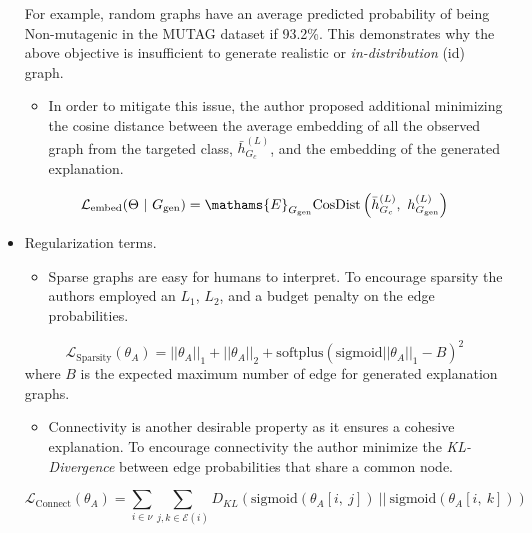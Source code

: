 \documentclass[
  11pt,
  letterpaper,
]{article}
\providecommand{\tightlist}{%
  \setlength{\itemsep}{0pt}\setlength{\parskip}{0pt}}\usepackage{longtable,booktabs,array}
\begin{document}
\begin{itemize}
  For example, random graphs have an average predicted probability of
  being Non-mutagenic in the MUTAG dataset if 93.2\%. This demonstrates
  why the above objective is insufficient to generate realistic or
  \emph{in-distribution} (id) graph.

  \begin{itemize}
  \tightlist
  \item
    In order to mitigate this issue, the author proposed additional
    minimizing the cosine distance between the average embedding of all
    the observed graph from the targeted class, \(\bar h^{(L)}_{G_c}\),
    and the embedding of the generated explanation.
  \end{itemize}

  \begin{equation}
       \mathcal{L}_{\text{embed}}(\Theta \ | \ G_\text{gen}) = 
            \mathams{E}_{G_\text{gen}}
            \text{CosDist}\left( \bar h^{(L)}_{G_c}, \ h^{(L)}_{G_\text{gen}} \right)
    \end{equation}
\item
  Regularization terms.

  \begin{itemize}
  \tightlist
  \item
    Sparse graphs are easy for humans to interpret. To encourage
    sparsity the authors employed an \(L_1\), \(L_2\), and a budget
    penalty on the edge probabilities.
  \end{itemize}

  \begin{equation}
        \mathcal{L}_{\text{Sparsity}}(\theta_A) = ||\theta_A||_1 + ||\theta_A||_2 + \text{softplus}(\text{sigmoid}||\theta_A||_1 - B)^2
    \end{equation} where \(B\) is the expected maximum number of edge
  for generated explanation graphs.

  \begin{itemize}
  \tightlist
  \item
    Connectivity is another desirable property as it ensures a cohesive
    explanation. To encourage connectivity the author minimize the
    \emph{KL-Divergence} between edge probabilities that share a common
    node.
  \end{itemize}

  \begin{equation}
        \mathcal{L}_{\text{Connect}}(\theta_A) = \sum_{i \in \nu} \sum_{j, k \in \mathcal{E}(i)} D_{KL}(\text{sigmoid}(\theta_A[i, \ j]) \ || \ \text{sigmoid}(\theta_A[i, \ k]))
    \end{equation}


\end{itemize}
\end{document}
